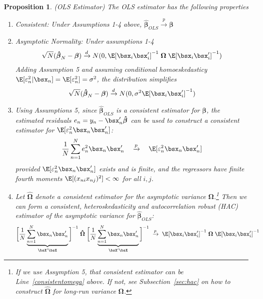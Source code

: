 \documentclass[12pt]{article}
\theoremstyle{plain}
\newtheorem{prop}[thm]{Proposition}
\theoremstyle{definition}
\theoremstyle{remark}
\newcommand{\bsbeta}{\boldsymbol{\beta}}
\newcommand{\bsOmega}{\boldsymbol{\Omega}}
\newcommand{\bshatbeta}{\boldsymbol{\hat{\beta}}}
\newcommand{\bshatOmega}{\boldsymbol{\hat{\Omega}}}
\newcommand{\pto}{\xrightarrow{p}}
\newcommand{\dto}{\xrightarrow{d}}
\newcommand{\sumnN}{\sum^N_{n=1}}
\begin{document}
\begin{prop}\emph{(OLS Estimator)}
The OLS estimator has the following properties
\begin{enumerate}
  \item \emph{Consistent}: Under Assumptions 1-4 above,
    $\bshatbeta_{OLS}\pto \bsbeta$
  \item \emph{Asymptotic Normality}: Under assumptions 1-4
    \begin{align*}
      \sqrt{N}(\bshatbeta_N- \bsbeta) \dto
      N(0,\E[\bsx_i\bsx_i']^{-1}\;\bsOmega\;\E[\bsx_i\bsx_i']^{-1})
    \end{align*}
    Adding Assumption 5 and assuming conditional homoeskedasticy
    $\E[\varepsilon_n^2|\bsx_n]=\E[\varepsilon_n^2]=\sigma^2$, the
    distribution simplifies
    \begin{align*}
      \sqrt{N}(\bshatbeta_N- \bsbeta) \dto
      N(0,\sigma^2\E[\bsx_i\bsx_i']^{-1})
    \end{align*}

  \item Using Assumptions 5, since $\bshatbeta_{OLS}$ is a consistent
    estimator for $\bsbeta$, the estimated residuals
    $e_n = y_n - \bsx_n' \bshatbeta$ can be used to construct a
    consistent estimator for $\E[\varepsilon_n^2\bsx_n\bsx_n']$:
    \begin{align}
      \frac{1}{N} \sumnN e^2_n \bsx_n \bsx_n'
      \quad\pto\quad
      \E[\varepsilon_n^2\bsx_n\bsx_n']
      \label{consistentomega}
    \end{align}
    provided $\E[\varepsilon_n^2\bsx_n\bsx_n']$ exists and is finite,
    and the regressors have finite fourth moments
    $\E[(x_{ni}x_{nj})^2]<\infty$ for all $i,j$.

  \item
    Let $\bshatOmega$ denote a consistent estimator for the asymptotic
    variance $\bsOmega$.\footnote{%
      If we use Assymption 5, that consistent estimator can be
      Line~\ref{consistentomega} above. If not, see
      Subsection~\ref{sec:hac} on how to construct $\bshatOmega$ for
      long-run variance $\bsOmega$.
    }
    Then we can form a consistent, heteroskedasticity and
    autocorrelation robust (HAC) estimator of the asymptotic variance
    for $\bshatbeta_{OLS}$:
    \begin{align*}
      \bigg[
        \frac{1}{N} \underbrace{\sumnN \bsx_n\bsx_n'}_{\bsX'\bsX}
      \bigg]^{-1}
      \;
      \bshatOmega\;
      \bigg[
        \frac{1}{N} \underbrace{\sumnN \bsx_n\bsx_n'}_{\bsX'\bsX}
      \bigg]^{-1}
      \;\pto\;
      \E[\bsx_i\bsx_i']^{-1}\;\bsOmega\;\E[\bsx_i\bsx_i']^{-1}
    \end{align*}


\end{enumerate}
\end{prop}
\end{document}
